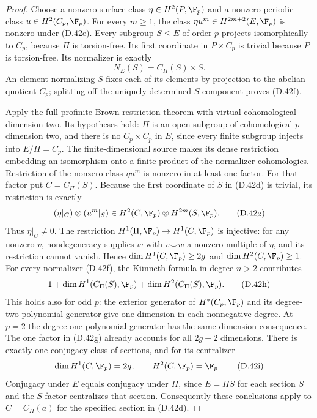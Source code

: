 \begin{proof}
Choose a nonzero surface class
$\eta\in H^2(P,\F_p)$ and a nonzero periodic
class $u\in H^2(C_p,\F_p)$.
For every $m\geq1$, the class
$\eta u^m\in H^{2m+2}(E,\F_p)$ is nonzero
under (D.42e).
Every subgroup $S\leq E$ of order $p$ projects
isomorphically to $C_p$, because $\Pi$ is
torsion-free.  Its first coordinate in $P\times C_p$
is trivial because $P$ is torsion-free.
Its normalizer is exactly
\[
               N_E(S)=C_\Pi(S)\times S.                 \tag{D.42f}
\]
An element normalizing $S$ fixes each of its elements
by projection to the abelian quotient $C_p$;
splitting off the uniquely determined $S$ component
proves (D.42f).

Apply the full profinite Brown restriction theorem
\cite[Theorem 2 and \S1.1]{A-KochloukovaZalesskii2007}
with virtual cohomological dimension two.
Its hypotheses hold: $\Pi$ is an open subgroup
of cohomological $p$-dimension two, and there is
no $C_p\times C_p$ in $E$, since every finite
subgroup injects into $E/\Pi=C_p$.
The finite-dimensional source makes its dense
restriction embedding an isomorphism onto a
finite product of the normalizer cohomologies.
Restriction of the nonzero class $\eta u^m$
is nonzero in at least one factor.
For that factor put $C=C_\Pi(S)$.
Because the first coordinate of $S$ in (D.42d)
is trivial, its restriction is exactly
\[
        (\eta|_C)\otimes(u^m|_S)
       \in H^2(C,\F_p)\otimes H^{2m}(S,\F_p).
                                                        \tag{D.42g}
\]
Thus $\eta|_C\ne0$.
The restriction
$H^1(\Pi,\F_p)\to H^1(C,\F_p)$ is injective:
for any nonzero $v$, nondegeneracy supplies $w$
with $v\smile w$ a nonzero multiple of $\eta$,
and its restriction cannot vanish.
Hence $\dim H^1(C,\F_p)\geq2g$ and
$\dim H^2(C,\F_p)\geq1$.
For every normalizer (D.42f), the K\"unneth formula
in degree $n>2$ contributes
\[
  1+\dim H^1(C_\Pi(S),\F_p)
                +\dim H^2(C_\Pi(S),\F_p).              \tag{D.42h}
\]
This holds also for odd $p$: the exterior generator
of $H^*(C_p,\F_p)$ and its degree-two polynomial
generator give one dimension in each nonnegative
degree.  At $p=2$ the degree-one polynomial
generator has the same dimension consequence.
The one factor in (D.42g) already accounts for
all $2g+2$ dimensions.  There is exactly one
conjugacy class of sections, and for its centralizer
\[
 \dim H^1(C,\F_p)=2g,\qquad H^2(C,\F_p)=\F_p.           \tag{D.42i}
\]
Conjugacy under $E$ equals conjugacy under $\Pi$,
since $E=\Pi S$ for each section $S$ and the
$S$ factor centralizes that section.
Consequently these conclusions apply to
$C=C_\Pi(a)$ for the specified section in (D.42d).


\end{proof}
